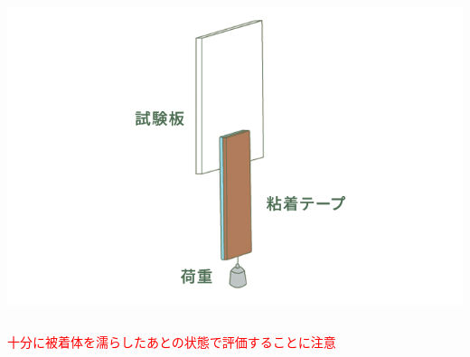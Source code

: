 \documentclass[unicode,12pt]{beamer}%
\begin{document}
\begin{frame}
\begin{columns}[c, onlytextwidth]
			\vspace{8mm}
			\includegraphics[width=\textwidth]{hojiryoku.png}
		\end{columns}
	\textcolor{red}{十分に被着体を濡らしたあとの状態で評価することに注意}
\end{frame}
\end{document}
